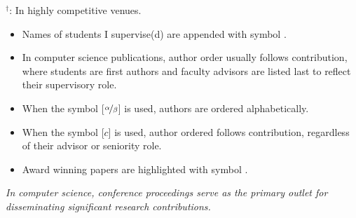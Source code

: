 {\hspace{10pt}
$^{\dagger}$: In highly competitive venues. 
\begin{itemize}[left=10pt]
\item Names of students I supervise(d) are appended with symbol \student{}.
\item In computer science publications, author order usually follows contribution, where students are first authors and faculty advisors are listed last to reflect their supervisory role. 
\item When the symbol [$\nicefrac{\alpha}{\beta}$] is used, authors are ordered alphabetically. 
\item When the symbol [$c$] is used, author ordered follows contribution, regardless of their advisor or seniority role. 
\item Award winning papers are highlighted with symbol \color{purple}{\faTrophy}. 
\end{itemize}
}


\smallskip
{\it In computer science, conference proceedings serve as the primary outlet for disseminating significant research contributions.
}

